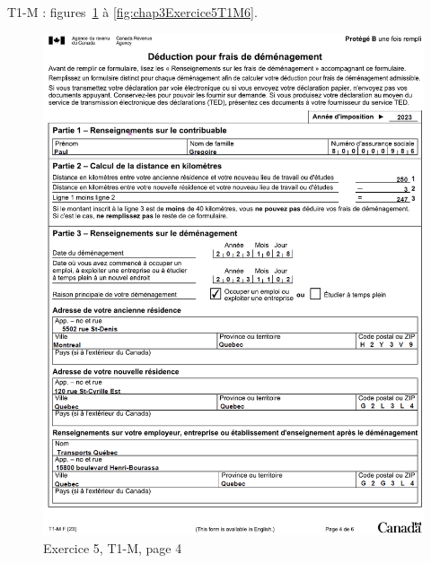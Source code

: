 T1-M : figures~\ref{fig:chap3Exercice5T1M4} à \ref{fig:chap3Exercice5T1M6}.
\begin{figure}
	\centering
	\includegraphics[width=.9\textwidth]{exercice/3-5/Q5/T1-M-p4.png}
	\caption{Exercice 5, T1-M, page 4}
	\label{fig:chap3Exercice5T1M4}
\end{figure}
